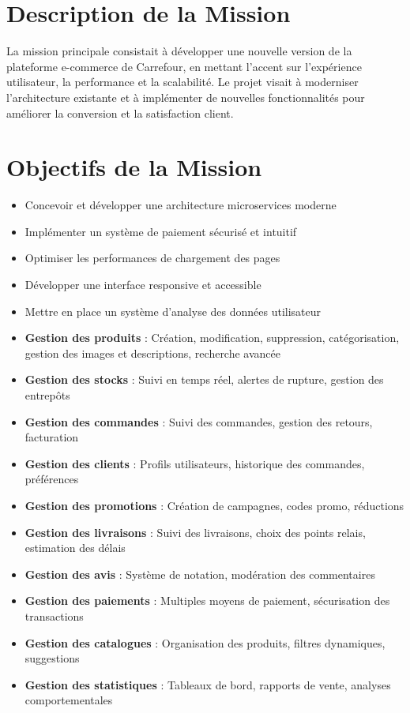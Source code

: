 \section{Description de la Mission}
La mission principale consistait à développer une nouvelle version de la plateforme e-commerce de Carrefour, en mettant l'accent sur l'expérience utilisateur, la performance et la scalabilité. Le projet visait à moderniser l'architecture existante et à implémenter de nouvelles fonctionnalités pour améliorer la conversion et la satisfaction client.

\section{Objectifs de la Mission}
\begin{itemize}
    \item Concevoir et développer une architecture microservices moderne
    \item Implémenter un système de paiement sécurisé et intuitif
    \item Optimiser les performances de chargement des pages
    \item Développer une interface responsive et accessible
    \item Mettre en place un système d'analyse des données utilisateur
    \item \textbf{Gestion des produits} : Création, modification, suppression, catégorisation, gestion des images et descriptions, recherche avancée
    \item \textbf{Gestion des stocks} : Suivi en temps réel, alertes de rupture, gestion des entrepôts
    \item \textbf{Gestion des commandes} : Suivi des commandes, gestion des retours, facturation
    \item \textbf{Gestion des clients} : Profils utilisateurs, historique des commandes, préférences
    \item \textbf{Gestion des promotions} : Création de campagnes, codes promo, réductions
    \item \textbf{Gestion des livraisons} : Suivi des livraisons, choix des points relais, estimation des délais
    \item \textbf{Gestion des avis} : Système de notation, modération des commentaires
    \item \textbf{Gestion des paiements} : Multiples moyens de paiement, sécurisation des transactions
    \item \textbf{Gestion des catalogues} : Organisation des produits, filtres dynamiques, suggestions
    \item \textbf{Gestion des statistiques} : Tableaux de bord, rapports de vente, analyses comportementales
\end{itemize}


